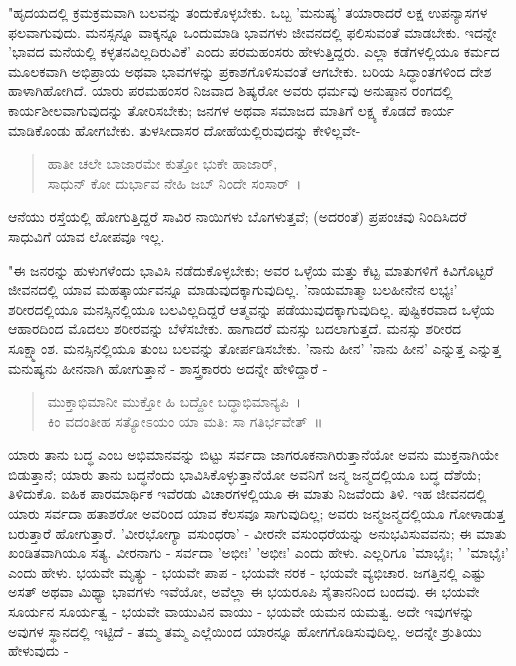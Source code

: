 "ಹೃದಯದಲ್ಲಿ ಕ್ರಮಕ್ರಮವಾಗಿ ಬಲವನ್ನು ತಂದುಕೊಳ್ಳಬೇಕು. ಒಬ್ಬ 'ಮನುಷ್ಯ' ತಯಾರಾದರೆ ಲಕ್ಷ ಉಪನ್ಯಾಸಗಳ ಫಲವಾಗುವುದು. ಮನಸ್ಸನ್ನೂ ವಾಕ್ಕನ್ನೂ ಒಂದುಮಾಡಿ ಭಾವಗಳು ಜೀವನದಲ್ಲಿ ಫಲಿಸುವಂತೆ ಮಾಡಬೇಕು. ಇದನ್ನೇ 'ಭಾವದ ಮನೆಯಲ್ಲಿ ಕಳ್ಳತನವಿಲ್ಲದಿರುವಿಕೆ' ಎಂದು ಪರಮಹಂಸರು ಹೇಳುತ್ತಿದ್ದರು. ಎಲ್ಲಾ ಕಡೆಗಳಲ್ಲಿಯೂ ಕರ್ಮದ ಮೂಲಕವಾಗಿ ಅಭಿಪ್ರಾಯ ಅಥವಾ ಭಾವಗಳನ್ನು ಪ್ರಕಾಶಗೊಳಿಸುವಂತೆ ಆಗಬೇಕು. ಬರಿಯ ಸಿದ್ಧಾಂತಗಳಿಂದ ದೇಶ ಹಾಳಾಗಿಹೋಗಿದೆ. ಯಾರು ಪರಮಹಂಸರ ನಿಜವಾದ ಶಿಷ್ಯರೋ ಅವರು ಧರ್ಮವು ಅನುಷ್ಠಾನ ರಂಗದಲ್ಲಿ ಕಾರ್ಯಶೀಲವಾಗುವುದನ್ನು ತೋರಿಸಬೇಕು; ಜನಗಳ ಅಥವಾ ಸಮಾಜದ ಮಾತಿಗೆ ಲಕ್ಷ್ಯ ಕೊಡದೆ ಕಾರ್ಯ ಮಾಡಿಕೊಂಡು ಹೋಗಬೇಕು. ತುಳಸೀದಾಸರ ದೋಹೆಯಲ್ಲಿರುವುದನ್ನು ಕೇಳಿಲ್ಲವೇ-

\begin{verse}
ಹಾತೀ ಚಲೇ ಬಾಜಾರಮೇ ಕುತ್ತೋ ಭುಕೇ ಹಾಜಾರ್,\\ಸಾಧುನ್ ಕೋ ದುರ್ಭಾವ ನೇಹಿ ಜಬ್ ನಿಂದೇ ಸಂಸಾರ್~।
\end{verse}

ಆನೆಯು ರಸ್ತೆಯಲ್ಲಿ ಹೋಗುತ್ತಿದ್ದರೆ ಸಾವಿರ ನಾಯಿಗಳು ಬೊಗಳುತ್ತವೆ; (ಅದರಂತೆ) ಪ್ರಪಂಚವು ನಿಂದಿಸಿದರೆ ಸಾಧುವಿಗೆ ಯಾವ ಲೋಪವೂ ಇಲ್ಲ.

"ಈ ಜನರನ್ನು ಹುಳುಗಳೆಂದು ಭಾವಿಸಿ ನಡೆದುಕೊಳ್ಳಬೇಕು; ಅವರ ಒಳ್ಳೆಯ ಮತ್ತು ಕೆಟ್ಟ ಮಾತುಗಳಿಗೆ ಕಿವಿಗೊಟ್ಟರೆ ಜೀವನದಲ್ಲಿ ಯಾವ ಮಹತ್ಕಾರ್ಯವನ್ನೂ ಮಾಡುವುದಕ್ಕಾಗುವುದಿಲ್ಲ. 'ನಾಯಮಾತ್ಮಾ ಬಲಹೀನೇನ ಲಭ್ಯಃ' ಶರೀರದಲ್ಲಿಯೂ ಮನಸ್ಸಿನಲ್ಲಿಯೂ ಬಲವಿಲ್ಲದಿದ್ದರೆ ಆತ್ಮವನ್ನು ಪಡೆಯುವುದಕ್ಕಾಗುವುದಿಲ್ಲ. ಪುಷ್ಟಿಕರವಾದ ಒಳ್ಳೆಯ ಆಹಾರದಿಂದ ಮೊದಲು ಶರೀರವನ್ನು ಬೆಳೆಸಬೇಕು. ಹಾಗಾದರೆ ಮನಸ್ಸು ಬದಲಾಗುತ್ತದೆ. ಮನಸ್ಸು ಶರೀರದ ಸೂಕ್ಷ್ಮಾಂಶ. ಮನಸ್ಸಿನಲ್ಲಿಯೂ ತುಂಬ ಬಲವನ್ನು ತೋರ್ಪಡಿಸಬೇಕು. 'ನಾನು ಹೀನ' 'ನಾನು ಹೀನ' ಎನ್ನುತ್ತ ಎನ್ನುತ್ತ ಮನುಷ್ಯನು ಹೀನನಾಗಿ ಹೋಗುತ್ತಾನೆ - ಶಾಸ್ತ್ರಕಾರರು ಅದನ್ನೇ ಹೇಳಿದ್ದಾರೆ -

\begin{verse}
ಮುಕ್ತಾಭಿಮಾನೀ ಮುಕ್ತೋ ಹಿ ಬದ್ದೋ ಬದ್ಧಾಭಿಮಾನ್ಯಪಿ~।\\ಕಿಂ ವದಂತೀಹ ಸತ್ಯೋಽಯಂ ಯಾ ಮತಿ: ಸಾ ಗತಿರ್ಭವೇತ್~॥
\end{verse}

ಯಾರು ತಾನು ಬದ್ಧ ಎಂಬ ಅಭಿಮಾನವನ್ನು ಬಿಟ್ಟು ಸರ್ವದಾ ಜಾಗರೂಕನಾಗಿರುತ್ತಾನೆಯೋ ಅವನು ಮುಕ್ತನಾಗಿಯೇ ಬಿಡುತ್ತಾನೆ; ಯಾರು ತಾನು ಬದ್ಧನೆಂದು ಭಾವಿಸಿಕೊಳ್ಳುತ್ತಾನೆಯೋ ಅವನಿಗೆ ಜನ್ಮ ಜನ್ಮದಲ್ಲಿಯೂ ಬದ್ಧ ದೆಶೆಯೆ; ತಿಳಿದುಕೊ. ಐಹಿಕ ಪಾರಮಾರ್ಥಿಕ ಇವೆರಡು ವಿಚಾರಗಳಲ್ಲಿಯೂ ಈ ಮಾತು ನಿಜವೆಂದು ತಿಳಿ. ಇಹ ಜೀವನದಲ್ಲಿ ಯಾರು ಸರ್ವದಾ ಹತಾಶರೋ ಅವರಿಂದ ಯಾವ ಕೆಲಸವೂ ಸಾಗುವುದಿಲ್ಲ; ಅವರು ಜನ್ಮಜನ್ಮದಲ್ಲಿಯೂ ಗೋಳಾಡುತ್ತ ಬರುತ್ತಾರೆ ಹೋಗುತ್ತಾರೆ. 'ವೀರಭೋಗ್ಯಾ ವಸುಂಧರಾ' - ವೀರನೇ ವಸುಂಧರೆಯನ್ನು ಅನುಭವಿಸುವವನು; ಈ ಮಾತು ಖಂಡಿತವಾಗಿಯೂ ಸತ್ಯ. ವೀರನಾಗು - ಸರ್ವದಾ 'ಅಭೀಃ' 'ಅಭೀಃ' ಎಂದು ಹೇಳು. ಎಲ್ಲರಿಗೂ 'ಮಾಭೈಃ; ' 'ಮಾಭೈಃ' ಎಂದು ಹೇಳು. ಭಯವೇ ಮೃತ್ಯು - ಭಯವೇ ಪಾಪ - ಭಯವೇ ನರಕ - ಭಯವೇ ವ್ಯಭಿಚಾರ. ಜಗತ್ತಿನಲ್ಲಿ ಎಷ್ಟು ಅಸತ್ ಅಥವಾ ಮಿಥ್ಯಾ ಭಾವಗಳು ಇವೆಯೋ, ಅವೆಲ್ಲಾ ಈ ಭಯರೂಪಿ ಸೈತಾನನಿಂದ ಬಂದವು. ಈ ಭಯವೇ ಸೂರ್ಯನ ಸೂರ್ಯತ್ವ - ಭಯವೇ ವಾಯುವಿನ ವಾಯು - ಭಯವೇ ಯಮನ ಯಮತ್ವ. ಅದೇ ಇವುಗಳನ್ನು ಅವುಗಳ ಸ್ಥಾನದಲ್ಲಿ ಇಟ್ಟಿದೆ - ತಮ್ಮ ತಮ್ಮ ಎಲ್ಲೆಯಿಂದ ಯಾರನ್ನೂ ಹೋಗಗೊಡಿಸುವುದಿಲ್ಲ. ಅದನ್ನೇ ಶ್ರುತಿಯು ಹೇಳುವುದು -

